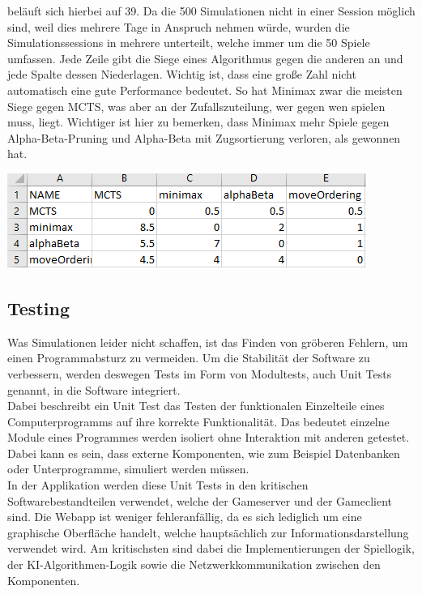 \documentclass[12pt,a4paper,bibliography=totocnumbered,listof=totocnumbered]{article}
\begin{document}
beläuft sich hierbei auf 39. Da die 500 Simulationen nicht in einer Session möglich sind, weil dies mehrere Tage in Anspruch nehmen würde,
wurden die Simulationssessions in mehrere unterteilt, welche immer um die 50 Spiele umfassen.
Jede Zeile gibt die Siege eines Algorithmus gegen die anderen an und jede Spalte dessen Niederlagen.
Wichtig ist, dass eine große Zahl nicht automatisch eine gute Performance bedeutet. So hat Minimax zwar die meisten
Siege gegen \ac{MCTS}, was aber an der Zufallszuteilung, wer gegen wen spielen muss, liegt. Wichtiger ist hier zu bemerken, dass Minimax mehr Spiele 
gegen Alpha-Beta-Pruning und Alpha-Beta mit Zugsortierung verloren, als gewonnen hat.


\vspace{1em}
\begin{minipage}{\linewidth}
	\centering
	\includegraphics[width=0.7\linewidth]{pics/ExcelSimulation.png}
	\label{fig:ExcelSimulation}
\end{minipage}


\subsection{Testing}
Was Simulationen leider nicht schaffen, ist das Finden von gröberen Fehlern, um einen Programmabsturz zu vermeiden.
Um die Stabilität der Software zu verbessern, werden deswegen Tests im Form von Modultests, auch Unit Tests genannt, in die Software integriert.
\\
Dabei beschreibt ein Unit Test das Testen der funktionalen Einzelteile eines Computerprogramms auf ihre korrekte Funktionalität. 
Das bedeutet einzelne Module eines Programmes werden isoliert ohne Interaktion mit anderen getestet. 
Dabei kann es sein, dass externe Komponenten, wie zum Beispiel Datenbanken oder Unterprogramme, simuliert werden müssen. \cite{UnitTestBook}
\\
In der Applikation werden diese Unit Tests in den kritischen Softwarebestandteilen verwendet, welche der Gameserver und der Gameclient sind.
Die Webapp ist weniger fehleranfällig, da es sich lediglich um eine graphische Oberfläche handelt, welche hauptsächlich zur Informationsdarstellung verwendet wird.
Am kritischsten sind dabei die Implementierungen der Spiellogik, der \ac{KI}-Algorithmen-Logik sowie die Netzwerkkommunikation zwischen den Komponenten. 
\end{document}
